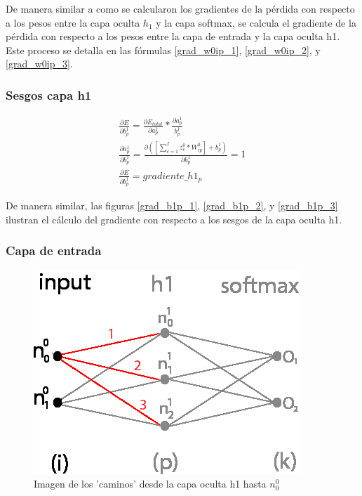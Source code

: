 De manera similar a como se calcularon los gradientes de la pérdida con respecto a los pesos entre la capa oculta $h_1$ y la capa softmax, se calcula el gradiente de la pérdida con respecto a los pesos entre la capa de entrada y la capa oculta h1. Este proceso se detalla en las fórmulas \ref{grad_w0ip_1}, \ref{grad_w0ip_2}, y \ref{grad_w0ip_3}.

\subsubsection{Sesgos capa h1}

\begin{gather}
	\frac{\partial E}{\partial b^1_p} = \frac{\partial E_{total} }{\partial a^1_p } * \frac{\partial a^1_p}{b^1_p} \label{grad_b1p_1} \\
	\frac{\partial a^1_p }{\partial b^1_p } = \frac{\partial ([\sum_{c=1}^{I} z^0_c * W^0_{ip}] + b^1_p) }{\partial b^1_p } = 1 \label{grad_b1p_2} \\
	\frac{\partial E}{\partial b^1_p} = gradiente\_h1_p
	\label{grad_b1p_3}
\end{gather}

De manera similar, las figuras \ref{grad_b1p_1}, \ref{grad_b1p_2}, y \ref{grad_b1p_3} ilustran el cálculo del gradiente con respecto a los sesgos de la capa oculta h1.

\subsubsection{Capa de entrada}

\begin{figure}[H]
	\centering
	\includegraphics[scale=0.35]{imagenes/nn_caminos_posibles_input.jpg}  
	\caption{Imagen de los 'caminos' desde la capa oculta h1 hasta $n^0_0$}
	\label{nn_caminos_posibles_input}
\end{figure}

